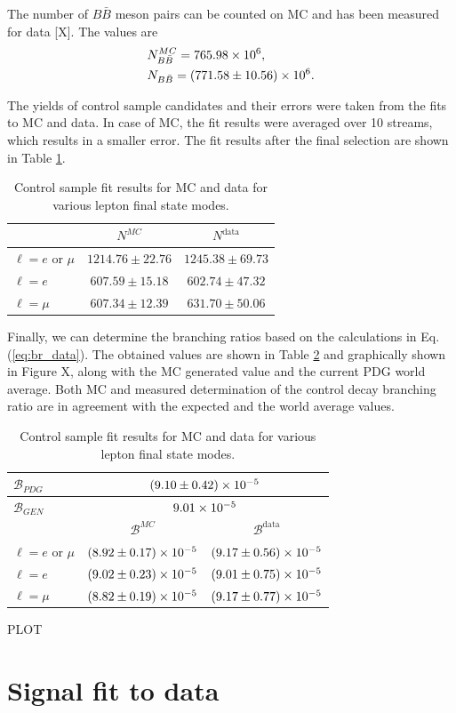 The number of $B\bar B$ meson pairs can be counted on MC and has been measured for data [X]. The values are
\begin{align*}
&N_{B\bar B}^{MC} = 765.98\times 10^{6},\\
&N_{B\bar B} = (771.58 \pm 10.56)\times 10^{6}.
\end{align*}

The yields of control sample candidates and their errors were taken from the fits to MC and data. In case of MC, the fit results were averaged over 10 streams, which results in a smaller error. The fit results after the final selection are shown in Table \ref{tab:fit_yield}.

\begin{table}[H]
	\centering
	\begin{tabular}{|l|c|c|}
\hline
 & $N^{MC}$ & $N^{\mathrm{data}}$ \\
\hline
$\ell = e$ or $\mu$ & $1214.76 \pm 22.76$ & $1245.38 \pm 69.73$\\
	\hline
$\ell = e$ & $607.59 \pm 15.18$ & $602.74 \pm 47.32$ \\
\hline
$\ell = \mu$ & $607.34 \pm 12.39$ & $631.70 \pm 50.06$\\
	\hline
\end{tabular}
\caption{Control sample fit results for MC and data for various lepton final state modes.}
\label{tab:fit_yield}
\end{table}

Finally, we can determine the branching ratios based on the calculations in Eq. (\ref{eq:br_data}). The obtained values are shown in Table \ref{tab:br_result} and graphically shown in Figure X, along with the MC generated value and the current PDG world average. Both MC and measured determination of the control decay branching ratio are in agreement with the expected and the world average values.

\begin{table}[H]
	\centering
	\begin{tabular}{|l|c|c|}
		\hline
		$\mathcal{B}_{PDG}$ & \multicolumn{2}{c|}{$(9.10\pm0.42)\times 10^{-5}$} \\
		\hline
     	$\mathcal{B}_{GEN}$ & \multicolumn{2}{c|}{$9.01\times 10^{-5}$} \\
     	\hline
		& $\mathcal{B}^{MC}$ & $\mathcal{B}^{\mathrm{data}}$ \\
		\hline
		$\ell = e$ or $\mu$ & $(8.92\pm0.17)\times 10^{-5}$ & $(9.17\pm0.56)\times 10^{-5}$\\
		\hline
		$\ell = e$ & $(9.02\pm0.23)\times 10^{-5}$ & $(9.01\pm0.75)\times 10^{-5}$ \\
		\hline
		$\ell = \mu$ & $(8.82\pm0.19)\times 10^{-5}$ & $(9.17\pm0.77)\times 10^{-5}$\\
		\hline
	\end{tabular}
	\caption{Control sample fit results for MC and data for various lepton final state modes.}
	\label{tab:br_result}
\end{table}

PLOT

\section{Signal fit to data}